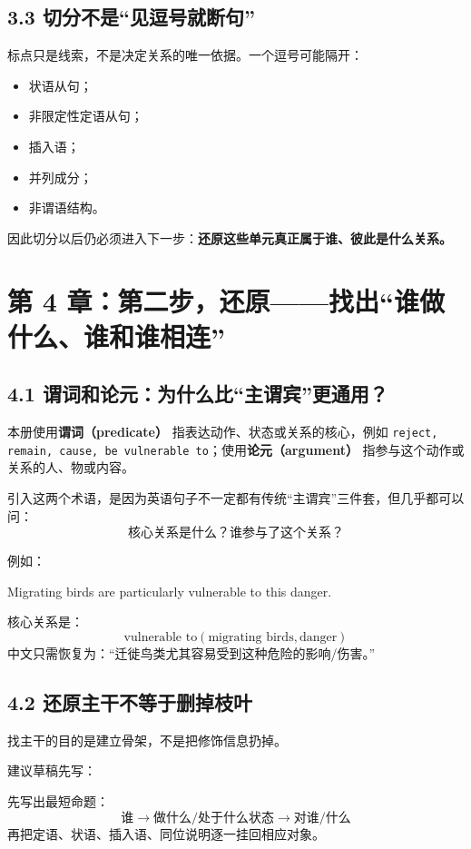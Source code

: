 \documentclass[11pt,a4paper]{ctexart}
\newcommand{\kw}[1]{\textbf{#1}}
\newcommand{\term}[2]{\textbf{#1（#2）}}
\begin{document}
\subsection{3.3 切分不是“见逗号就断句”}
标点只是线索，不是决定关系的唯一依据。一个逗号可能隔开：
\begin{itemize}
  \item 状语从句；
  \item 非限定性定语从句；
  \item 插入语；
  \item 并列成分；
  \item 非谓语结构。
\end{itemize}
因此切分以后仍必须进入下一步：\kw{还原这些单元真正属于谁、彼此是什么关系。}

\section{第 4 章：第二步，还原——找出“谁做什么、谁和谁相连”}

\subsection{4.1 谓词和论元：为什么比“主谓宾”更通用？}
本册使用\term{谓词}{predicate} 指表达动作、状态或关系的核心，例如 \texttt{reject, remain, cause, be vulnerable to}；使用\term{论元}{argument} 指参与这个动作或关系的人、物或内容。

引入这两个术语，是因为英语句子不一定都有传统“主谓宾”三件套，但几乎都可以问：
\[
\boxed{\text{核心关系是什么？谁参与了这个关系？}}
\]

例如：
\begin{eng}[例 10]
Migrating birds are particularly vulnerable to this danger.
\end{eng}
核心关系是：
\[
\text{vulnerable to}(
\text{migrating birds},
\text{danger})
\]
中文只需恢复为：“迁徙鸟类尤其容易受到这种危险的影响/伤害。”

\subsection{4.2 还原主干不等于删掉枝叶}
找主干的目的是建立骨架，不是把修饰信息扔掉。

建议草稿先写：
\begin{method}[骨架记录法]
先写出最短命题：
\[
\text{谁} \rightarrow \text{做什么/处于什么状态} \rightarrow \text{对谁/什么}
\]
再把定语、状语、插入语、同位说明逐一挂回相应对象。
\end{method}
\end{document}
